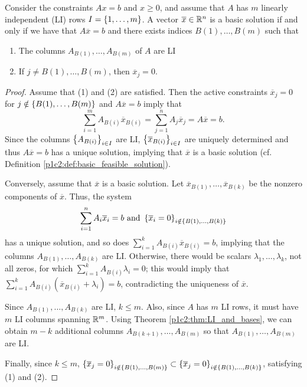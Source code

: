 \begin{theorem} \label{p1c3:thm:LI_and_bases}
	Consider the constraints $Ax = b$ and $x \geq 0$, and assume that $A$ has $m$ linearly independent (LI) rows $I = \left\{ 1,\dots,m \right \}$. A vector $\overline{x} \in \mathbb{R}^n$ is a basic solution if and only if we have that $A \overline{x} = b$ and there exists indices $B(1), \dots, B(m)$ such that
	\begin{enumerate}
		\item[(1)] The columns $A_{B(1)}, \dots, A_{B(m)}$ of $A$ are LI
		\item[(2)] If $j \neq B(1), \dots, B(m)$, then $\overline{x}_j = 0$.
	\end{enumerate} 
\end{theorem}

\begin{proof}
	Assume that (1) and (2) are satisfied. Then the active constraints $\overline{x}_j = 0$ for $j \notin \left\{ B(1), \dots, B(m) \right \}$ and $A\overline{x} = b$ imply that
%	
	\begin{equation*}
		\sum_{i=1}^m A_{B(i)}\overline{x}_{B(i)} = \sum_{j=1}^n A_j\overline{x}_j = A\overline{x} = b.
	\end{equation*}
%
	Since the columns $\left\{ A_{B(i)} \right \}_{i \in I}$ are LI, $\left\{ \overline{x}_{B(i)} \right \}_{i \in I}$ are uniquely determined and thus $A\overline{x} = b$ has a unique solution, implying that $\overline{x}$ is a basic solution (cf. Definition \ref{p1c2:def:basic_feasible_solution}).
	
	Conversely, assume that $\overline{x}$ is a basic solution. Let $\overline{x}_{B(1)}, \dots, \overline{x}_{B(k)}$ be the nonzero components of $\overline{x}$. Thus, the system 
%	
		\begin{equation*}
			\sum_{i=1}^n A_i\overline{x}_i = b \text{ and } \left\{ \overline{x}_i = 0 \right \}_{i \notin \left\{ B(1), \dots, B(k) \right \}}
		\end{equation*}
%
	has a unique solution, and so does $\sum_{i=1}^k A_{B(i)}\overline{x}_{B(i)} = b$, implying that the columns $A_{B(1)}, \dots, A_{B(k)}$ are LI. Otherwise, there would be scalars $\lambda_1,\dots, \lambda_k$, not all zeros, for which $\sum_{i=1}^k A_{B(i)}\lambda_i = 0$; this would imply that $\sum_{i=1}^k A_{B(i)}(\overline{x}_{B(i)} + \lambda_i) =b$, contradicting the uniqueness of $\overline{x}$.
	
	Since $A_{B(1)}, \dots, A_{B(k)}$ are LI, $k \leq m$. Also, since $A$ has $m$ LI rows, it must have $m$ LI columns spanning $\mathbb{R}^m$. Using Theorem \ref{p1c2:thm:LI_and_bases}, we can obtain $m-k$ additional columns $A_{B(k+1)}, \dots, A_{B(m)}$ so that $A_{B(1)}, \dots, A_{B(m)}$ are LI. 
	
	Finally, since $k \leq m $, $\left\{ \overline{x}_j = 0 \right \}_{i \notin \left\{ B(1), \dots, B(m) \right \}} \subset  \left\{ \overline{x}_j = 0 \right \}_{i \notin \left\{ B(1), \dots, B(k) \right \}}$, satisfying (1) and (2). \qedhere 		
\end{proof}	

